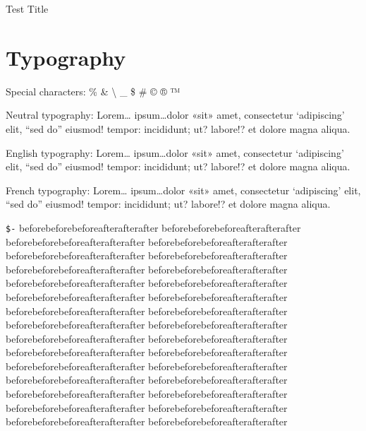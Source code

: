 \documentclass[demo]{pyscribe}
\begin{document}
\begin{center}
{\Large Test Title\par}
\end{center}
\newpage

\renewcommand\contentsname{Sommaire}
\tableofcontents



\chapter{Typography}

Special characters: \% \& \textbackslash{} \_ \$ \# © ® ™

Neutral typography: Lorem\dots{} ipsum\dots{}dolor «sit» amet, consectetur `adipiscing' elit, “sed do” eiusmod! tempor: incididunt; ut? labore!? et dolore magna aliqua. \par
English typography: Lorem\dots{} ipsum\dots{}dolor «sit» amet, consectetur `adipiscing' elit, “sed do” eiusmod! tempor: incididunt; ut? labore!? et dolore magna aliqua. \par
French typography: Lorem\dots{} ipsum\dots{}dolor «sit» amet, consectetur `adipiscing' elit, “sed do” eiusmod! tempor: incididunt; ut? labore!? et dolore magna aliqua. \par

\par\medskip
\texttt{\$-} beforebeforebefore\-afterafterafter beforebeforebefore\-afterafterafter beforebeforebefore\-afterafterafter beforebeforebefore\-afterafterafter beforebeforebefore\-afterafterafter beforebeforebefore\-afterafterafter beforebeforebefore\-afterafterafter beforebeforebefore\-afterafterafter beforebeforebefore\-afterafterafter beforebeforebefore\-afterafterafter beforebeforebefore\-afterafterafter beforebeforebefore\-afterafterafter beforebeforebefore\-afterafterafter beforebeforebefore\-afterafterafter beforebeforebefore\-afterafterafter beforebeforebefore\-afterafterafter beforebeforebefore\-afterafterafter beforebeforebefore\-afterafterafter beforebeforebefore\-afterafterafter beforebeforebefore\-afterafterafter beforebeforebefore\-afterafterafter beforebeforebefore\-afterafterafter beforebeforebefore\-afterafterafter beforebeforebefore\-afterafterafter beforebeforebefore\-afterafterafter beforebeforebefore\-afterafterafter beforebeforebefore\-afterafterafter beforebeforebefore\-afterafterafter beforebeforebefore\-afterafterafter beforebeforebefore\-afterafterafter 
\end{document}
